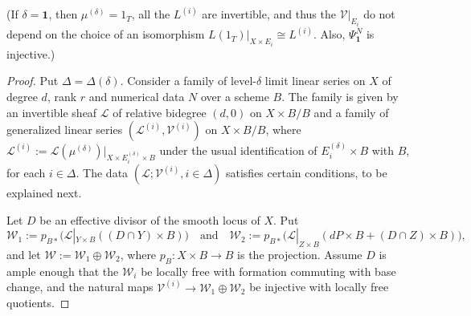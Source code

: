 \documentclass[a4paper,11pt]{amsart}
\theoremstyle{plain}
\theoremstyle{definition}
\theoremstyle{remark}
\def\L{\mathcal{L}}
\def\V{\mathcal{V}}
\def\W{\mathcal{W}}
\def\:{\colon}
\begin{document}
(If $\delta=\mathbf 1$, then $\mu^{(\delta)}=1_T$, all the $L^{(i)}$ are invertible, and thus the $\V|_{E_i}$ do not depend on the choice of an isomorphism $L(1_T)|_{X\times E_i}\cong L^{(i)}$. Also, $\Psi^N_{\mathbf 1}$ is injective.)


\begin{proof} Put $\Delta=\Delta(\delta)$. Consider a family of level-$\delta$ limit linear series on $X$ of degree $d$, rank $r$ and numerical data $N$ over a scheme $B$. 
The family is given by an invertible sheaf $\L$ of relative bidegree $(d,0)$ on $X\times B/B$ and a family of generalized linear series $(\L^{(i)},\mathcal V^{(i)})$ on $X\times B/B$, where $\L^{(i)}:=\L(\mu^{(\delta)})|_{X\times E_i^{(\delta)}\times B}$ under the usual identification of $E_i^{(\delta)}\times B$ with $B$, for each $i\in\Delta$. The data $(\L;\V^{(i)},i\in\Delta)$ satisfies certain conditions, to be explained next. 

Let $D$ be an effective divisor of the smooth locus of $X$. Put
\[
\mathcal W_1:=p_{B*}\big(\L|_{Y\times B}((D\cap Y)\times B)\big)
\quad\text{and}\quad
\mathcal W_2:=p_{B*}\big(\L|_{Z\times B}(dP\times B+(D\cap Z)\times B)\big),
\]
and let $\W:=\W_1\oplus\W_2$, where $p_B\:X\times B\to B$ is the projection. Assume $D$ is ample enough that the $\mathcal W_i$ be locally free with formation commuting with base change, and the natural maps $\V^{(i)}\to\mathcal W_1\oplus\mathcal W_2$ be injective with locally free quotients. 


\end{proof}
\end{document}
